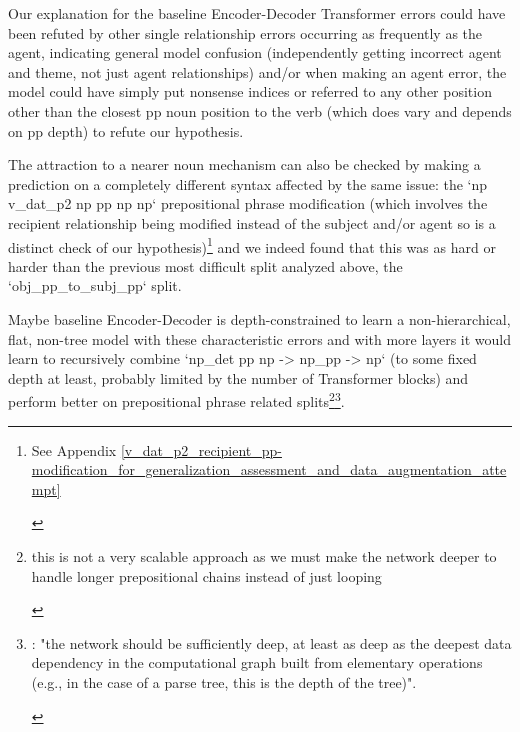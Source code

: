 \documentclass[11pt]{article}
\begin{document}
Our explanation for the \cite{Wu2023} baseline Encoder-Decoder Transformer errors could have been refuted by other single relationship errors occurring as frequently as the agent, indicating general model confusion (independently getting incorrect agent and theme, not just agent relationships) and/or when making an agent error, the model could have simply put nonsense indices or referred to any other position other than the closest pp noun position to the verb (which does vary and depends on pp depth) to refute our hypothesis.

The attraction to a nearer noun mechanism can also be checked by making a prediction on a completely different syntax affected by the same issue: the `np v\_dat\_p2 np pp np np` prepositional phrase modification (which involves the recipient relationship being modified instead of the subject and/or agent so is a distinct check of our hypothesis)\footnote{\begin{footnotesize}See Appendix \ref{v_dat_p2_recipient_pp-modification_for_generalization_assessment_and_data_augmentation_attempt}\end{footnotesize}} and we indeed found that this was as hard or harder than the previous most difficult split analyzed above, the `obj\_pp\_to\_subj\_pp` split.


Maybe \cite{Wu2023} baseline Encoder-Decoder is depth-constrained to learn a non-hierarchical, flat, non-tree model with these characteristic errors and with more layers it would learn to recursively combine `np\_det pp np -> np\_pp -> np` (to some fixed depth at least, probably limited by the number of Transformer blocks) and perform better on prepositional phrase related splits\footnote{\begin{footnotesize}this is not a very scalable approach as we must make the network deeper to handle longer prepositional chains instead of just looping
\end{footnotesize}
}\footnote{\begin{footnotesize}
\cite{Csordas2022}:
"the network should be sufficiently deep, at least as deep as the deepest data dependency in the computational graph built from elementary operations (e.g., in the case of a parse tree, this is the depth of the tree)".
\end{footnotesize}
}. 
\end{document}
